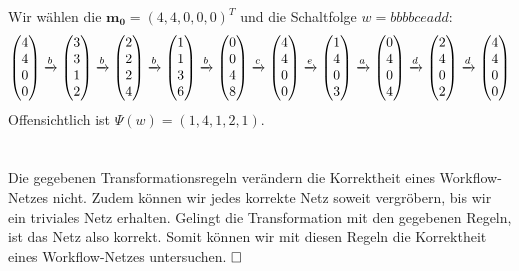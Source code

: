 \documentclass[12pt,a4paper]{../krautsourcing/homework}
\begin{document}
Wir wählen die \(\mathbf{m_0} = (4,4,0,0,0)^T\) und die Schaltfolge \(w = bbbbceadd\):
\begin{align*}
    \begin{pmatrix}4\\4\\0\\0\end{pmatrix}
    \xrightarrow{b}
    \begin{pmatrix}3\\3\\1\\2\end{pmatrix}
    \xrightarrow{b}
    \begin{pmatrix}2\\2\\2\\4\end{pmatrix}
    \xrightarrow{b}
    \begin{pmatrix}1\\1\\3\\6\end{pmatrix}
    \xrightarrow{b}
    \begin{pmatrix}0\\0\\4\\8\end{pmatrix}
    \xrightarrow{c}
    \begin{pmatrix}4\\4\\0\\0\end{pmatrix}
    \xrightarrow{e}
    \begin{pmatrix}1\\4\\0\\3\end{pmatrix}
    \xrightarrow{a}
    \begin{pmatrix}0\\4\\0\\4\end{pmatrix}
    \xrightarrow{d}
    \begin{pmatrix}2\\4\\0\\2\end{pmatrix}
    \xrightarrow{d}
    \begin{pmatrix}4\\4\\0\\0\end{pmatrix}
\end{align*}
Offensichtlich ist \(\Psi(w) = (1,4,1,2,1)\).

\section{}

\subsection{}

Die gegebenen Transformationsregeln verändern die Korrektheit eines Workflow-Netzes nicht. Zudem können wir jedes korrekte Netz soweit vergröbern, bis wir ein triviales Netz erhalten. Gelingt die Transformation mit den gegebenen Regeln, ist das Netz also korrekt. Somit können wir mit diesen Regeln die Korrektheit eines Workflow-Netzes untersuchen. \(\hfill \square\)
\end{document}
